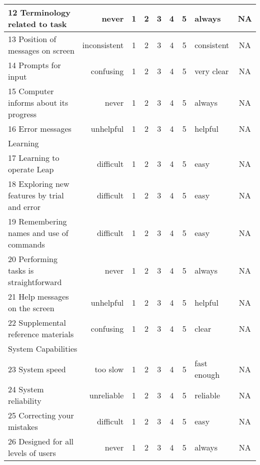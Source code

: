 \begin{table}[htbp]
\begin{tabular}{lrccccclc}
    12 Terminology related to task&never&1&2&3&4&5&always&NA\\ \hline
    13 Position of messages on screen&inconsistent&1&2&3&4&5&consistent&NA\\ \hline
    14 Prompts for input&confusing&1&2&3&4&5&very clear&NA\\ \hline
    15 Computer informs about its progress&never&1&2&3&4&5&always&NA\\ \hline
    16 Error messages&unhelpful&1&2&3&4&5&helpful&NA\\ \hline
    \hline
    \multicolumn{9}{l}{Learning} \\ \hline
    17 Learning to operate Leap&difficult&1&2&3&4&5&easy&NA\\ \hline
    18 Exploring new features by trial and error&difficult&1&2&3&4&5&easy&NA\\ \hline
    19 Remembering names and use of commands&difficult&1&2&3&4&5&easy&NA\\ \hline
    20 Performing tasks is straightforward&never&1&2&3&4&5&always&NA\\ \hline
    21 Help messages on the screen&unhelpful&1&2&3&4&5&helpful&NA\\ \hline
    22 Supplemental reference materials&confusing&1&2&3&4&5&clear&NA\\ \hline
    \hline
    \multicolumn{9}{l}{System Capabilities} \\ \hline
    23 System speed&too slow&1&2&3&4&5&fast enough&NA\\ \hline
    24 System reliability&unreliable&1&2&3&4&5&reliable&NA\\ \hline
    25 Correcting your mistakes&difficult&1&2&3&4&5&easy&NA\\ \hline
    26 Designed for all levels of users&never&1&2&3&4&5&always&NA\\ \hline
  \end{tabular}
\end{table}

